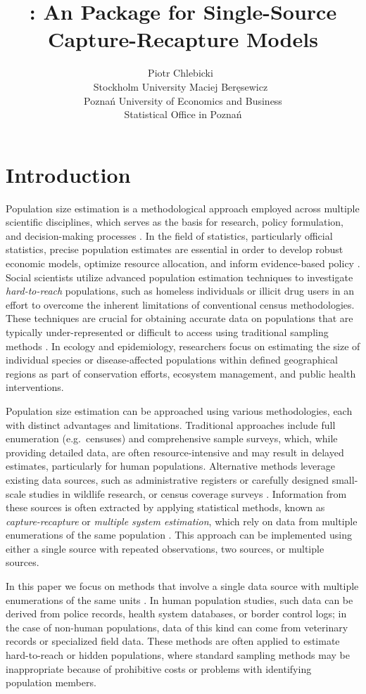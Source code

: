 \documentclass[
]{jss}
\author{
Piotr Chlebicki~\orcidlink{0009-0006-4867-7434}\\Stockholm
University \And Maciej
Beręsewicz~\orcidlink{0000-0002-8281-4301}\\Poznań University of
Economics and Business\\
Statistical Office in Poznań
}
\title{\pkg{singleRcapture}: An \proglang{R} Package for Single-Source
Capture-Recapture Models}
\newcommand{\1}{\mathcal{I}} \newcommand{\bZero}{\boldsymbol{0}}
\begin{document}
\section{Introduction}\label{sec-introduction}

Population size estimation is a methodological approach employed across
multiple scientific disciplines, which serves as the basis for research,
policy formulation, and decision-making processes
\citep[cf.][]{bohning2018capture}. In the field of statistics,
particularly official statistics, precise population estimates are
essential in order to develop robust economic models, optimize resource
allocation, and inform evidence-based policy
\citep[cf.][]{baffour2013modern}. Social scientists utilize advanced
population estimation techniques to investigate \emph{hard-to-reach}
populations, such as homeless individuals or illicit drug users in an
effort to overcome the inherent limitations of conventional census
methodologies. These techniques are crucial for obtaining accurate data
on populations that are typically under-represented or difficult to
access using traditional sampling methods
\citep[cf.][]{vincent2022estimating}. In ecology and epidemiology,
researchers focus on estimating the size of individual species or
disease-affected populations within defined geographical regions as part
of conservation efforts, ecosystem management, and public health
interventions.

Population size estimation can be approached using various
methodologies, each with distinct advantages and limitations.
Traditional approaches include full enumeration (e.g.~censuses) and
comprehensive sample surveys, which, while providing detailed data, are
often resource-intensive and may result in delayed estimates,
particularly for human populations. Alternative methods leverage
existing data sources, such as administrative registers or carefully
designed small-scale studies in wildlife research, or census coverage
surveys \citep[cf.][]{wolter1986some, zhang2019note}. Information from
these sources is often extracted by applying statistical methods, known
as \emph{capture-recapture} or \emph{multiple system estimation}, which
rely on data from multiple enumerations of the same population
\citep[cf.][]{dunne2024system}. This approach can be implemented using
either a single source with repeated observations, two sources, or
multiple sources.

In this paper we focus on methods that involve a single data source with
multiple enumerations of the same units \citep[cf.][]{ztpoisson}. In
human population studies, such data can be derived from police records,
health system databases, or border control logs; in the case of
non-human populations, data of this kind can come from veterinary
records or specialized field data. These methods are often applied to
estimate hard-to-reach or hidden populations, where standard sampling
methods may be inappropriate because of prohibitive costs or problems
with identifying population members.
\end{document}
